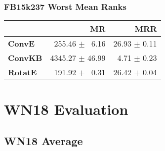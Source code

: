 \documentclass{article}
\begin{document}
\subsubsection{FB15k237 Worst Mean Ranks}
    \begin{center}
    \begin{tabular}{lrr}
\toprule
{} &               MR &           MRR \\
\midrule
\textbf{ConvE } &  $\phantom{5}$255.46 $\pm$ $\phantom{5}$6.16 &  26.93 $\pm$ 0.11 \\
\textbf{ConvKB} &  4345.27 $\pm$ 46.99 &  $\phantom{5}$4.71 $\pm$ 0.23 \\
\textbf{RotatE} &  $\phantom{5}$191.92 $\pm$ $\phantom{5}$0.31 &  26.42 $\pm$ 0.04 \\
\bottomrule
\end{tabular}

    \end{center}

\section{WN18 Evaluation}
\subsection{WN18 Average}
\end{document}
